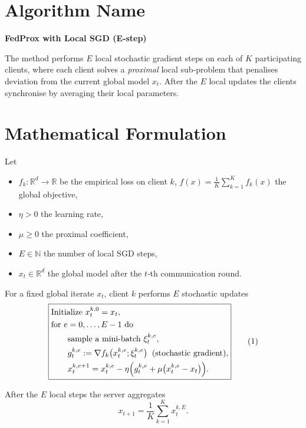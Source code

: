 \documentclass{article}
\begin{document}
\section*{Algorithm Name}
\textbf{FedProx with Local SGD (E‑step)}  

The method performs $E$ local stochastic gradient steps on each of $K$ participating
clients, where each client solves a \emph{proximal} local sub‑problem that penalises
deviation from the current global model $x_t$. After the $E$ local updates the
clients synchronise by averaging their local parameters.

\vspace{0.3cm}
\section*{Mathematical Formulation}
Let  

\begin{itemize}[noitemsep,topsep=0pt]
\item $f_k:\mathbb{R}^d\!\to\!\mathbb{R}$ be the empirical loss on client $k$,
      $f(x)=\frac1K\sum_{k=1}^K f_k(x)$ the global objective,
\item $\eta>0$ the learning rate,
\item $\mu\ge 0$ the proximal coefficient,
\item $E\in\mathbb{N}$ the number of local SGD steps,
\item $x_t\in\mathbb{R}^d$ the global model after the $t$‑th communication round.
\end{itemize}

For a fixed global iterate $x_t$, client $k$ performs $E$ stochastic updates
\[
\boxed{
\begin{aligned}
&\text{Initialize } x_{t}^{k,0}=x_t,\\
&\text{for } e=0,\dots ,E-1\text{ do}\\
&\qquad \text{sample a mini‑batch } \xi_{t}^{k,e},\\
&\qquad g_{t}^{k,e}:=\nabla f_k\bigl(x_{t}^{k,e};\xi_{t}^{k,e}\bigr) \;\; \text{(stochastic gradient)},\\
&\qquad x_{t}^{k,e+1}=x_{t}^{k,e}-\eta\Bigl(g_{t}^{k,e}+ \mu\bigl(x_{t}^{k,e}-x_t\bigr)\Bigr).
\end{aligned}}
\tag{1}
\]

After the $E$ local steps the server aggregates
\[
\boxed{x_{t+1}= \frac1K\sum_{k=1}^K x_{t}^{k,E}}. \tag{2}
\]

\newpage
\end{document}
